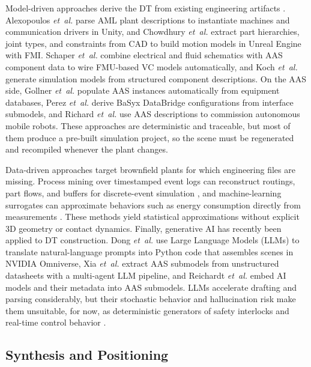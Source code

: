 \documentclass{ieeeojies}
\newcommand{\etal}{\textit{et~al.}}
\begin{document}
Model-driven approaches derive the DT from existing engineering artifacts \cite{Luder2020,Herzog2025}. Alexopoulos \etal \cite{Alexopoulos2025} parse AML plant descriptions to instantiate machines and communication drivers in Unity, and Chowdhury \etal \cite{Chowdhury2025} extract part hierarchies, joint types, and constraints from CAD to build motion models in Unreal Engine with FMI. Schaper \etal \cite{Schaper2025} combine electrical and fluid schematics with AAS component data to wire FMU-based VC models automatically, and Koch \etal \cite{Koch2024} generate simulation models from structured component descriptions. On the AAS side, Gollner \etal \cite{Gollner2022} populate AAS instances automatically from equipment databases, Perez \etal \cite{Perez2025} derive BaSyx DataBridge configurations from interface submodels, and Richard \etal \cite{Pretz2025} use AAS descriptions to commission autonomous mobile robots. These approaches are deterministic and traceable, but most of them produce a pre-built simulation project, so the scene must be regenerated and recompiled whenever the plant changes.

Data-driven approaches target brownfield plants for which engineering files are missing. Process mining over timestamped event logs can reconstruct routings, part flows, and buffers for discrete-event simulation \cite{Lugaresi2021}, and machine-learning surrogates can approximate behaviors such as energy consumption directly from measurements \cite{Garcia2023}. These methods yield statistical approximations without explicit 3D geometry or contact dynamics. Finally, generative AI has recently been applied to DT construction. Dong \etal \cite{Dong2024} use Large Language Models (LLMs) to translate natural-language prompts into Python code that assembles scenes in NVIDIA Omniverse, Xia \etal \cite{Xia2024} extract AAS submodels from unstructured datasheets with a multi-agent LLM pipeline, and Reichardt \etal \cite{Reichardt2024} embed AI models and their metadata into AAS submodels. LLMs accelerate drafting and parsing considerably, but their stochastic behavior and hallucination risk make them unsuitable, for now, as deterministic generators of safety interlocks and real-time control behavior \cite{Dong2024,Xia2024}.

\subsection{Synthesis and Positioning}
\label{sec:rw_synthesis}
\end{document}
